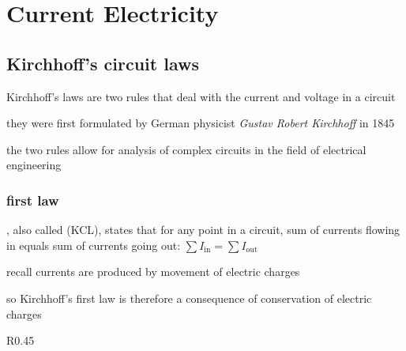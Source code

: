 \section{Current Electricity}




\subsection{Kirchhoff's circuit laws}

Kirchhoff's laws are two rules that deal with the current and voltage in a circuit

they were first formulated by German physicist \emph{Gustav Robert Kirchhoff} in 1845

the two rules allow for analysis of complex circuits in the field of electrical engineering

\subsubsection{first law}

\begin{ilight}
	, also called  (KCL), states that for any point in a circuit, sum of currents flowing in equals sum of currents going out: $\boxed{\sum I_\text{in} = \sum I_\text{out}}$
\end{ilight}

\cmt recall currents are produced by movement of electric charges

so Kirchhoff's first law is therefore a consequence of conservation of electric charges

\begin{wrapfigure}{R}{0.45\textwidth}
	\vspace{-21pt}
	\begin{center}
	\end{center}
	\vspace{-20pt}
\end{wrapfigure}

